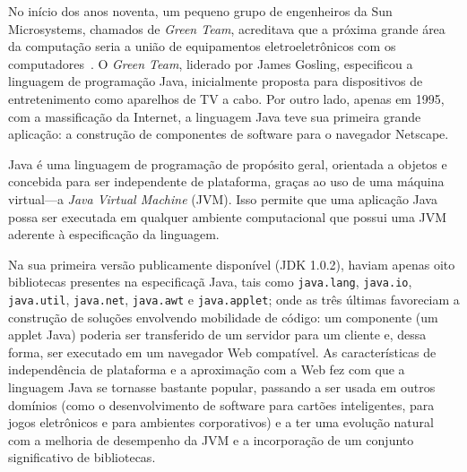 No in\'{i}cio dos anos noventa, um pequeno grupo de engenheiros da 
Sun Microsystems, chamados de \textit{Green Team}, acreditava 
que a pr\'{o}xima grande \'{a}rea da computaç\~{a}o 
seria a uni\~{a}o de equipamentos eletroeletrônicos com os 
computadores~\cite{}. O \textit{Green Team}, liderado por James Gosling, 
especificou a linguagem de programaç\~{a}o Java, 
inicialmente proposta para dispositivos de entretenimento 
como aparelhos de TV a cabo. Por outro lado, apenas em 1995, 
com a massificaç\~{a}o da Internet, a linguagem Java 
teve sua primeira grande aplicaç\~{a}o: a constru\c c\~{a}o 
de componentes de software para o navegador Netscape.

Java \'{e} uma linguagem de programaç\~{a}o de prop\'{o}sito geral, 
orientada a objetos e concebida para ser independente de plataforma, 
gra\c cas ao uso de uma m\'{a}quina virtual---a 
\emph{Java Virtual Machine} (JVM). Isso permite 
que uma aplica\c c\~{a}o Java
possa ser executada em qualquer ambiente computacional que possui 
uma JVM aderente \`{a} especifica\c c\~{a}o da linguagem.

Na sua primeira vers\~{a}o publicamente dispon\'{i}vel 
(\acs{JDK} 1.0.2), haviam apenas oito bibliotecas 
presentes na especifica\c c\~{a} Java, tais como 
\texttt{java.lang}, \texttt{java.io}, \texttt{java.util},  
\texttt{java.net}, \texttt{java.awt} e \texttt{java.applet}; 
onde as tr\^{e}s \'{u}ltimas favoreciam a constru\c c\~{a}o de 
solu\c c\~{o}es envolvendo mobilidade de c\'{o}digo:
um componente (um applet Java) poderia ser transferido de um 
servidor para um cliente e, dessa forma, 
ser executado em um navegador Web compat\'{i}vel. As caracter\'{i}sticas de 
independ\^{e}ncia de plataforma e a aproxima\c c\~{a}o com a Web fez 
com que a linguagem Java se tornasse bastante popular, passando a ser 
usada em outros dom\'{i}nios (como o desenvolvimento de software 
para cart\~{o}es inteligentes, para jogos eletr\^{o}nicos e para ambientes corporativos) e a ter 
uma evolu\c c\~{a}o natural com a melhoria de desempenho da 
JVM e a incorpora\c c\~{a}o de um conjunto significativo de 
bibliotecas. 

